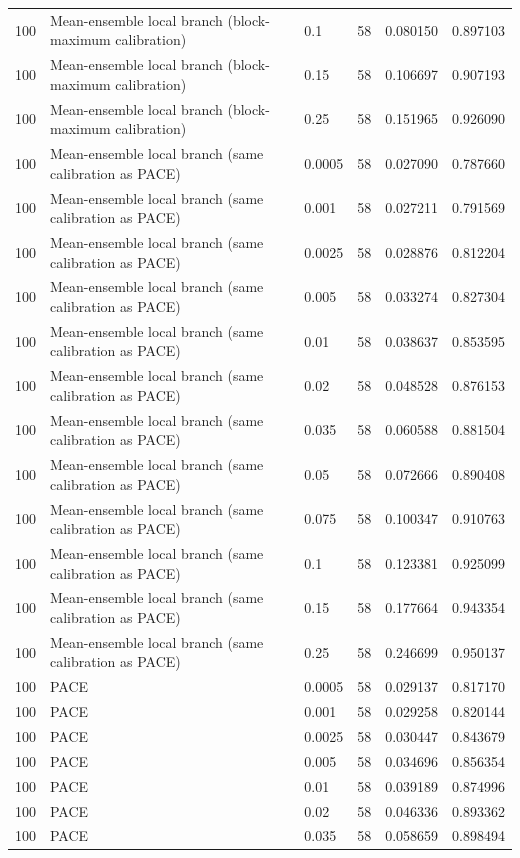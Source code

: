 \begin{tabular}{llllll}
100 & Mean-ensemble local branch (block-maximum calibration) & 0.1 & 58 & 0.080150 & 0.897103 \\
100 & Mean-ensemble local branch (block-maximum calibration) & 0.15 & 58 & 0.106697 & 0.907193 \\
100 & Mean-ensemble local branch (block-maximum calibration) & 0.25 & 58 & 0.151965 & 0.926090 \\
100 & Mean-ensemble local branch (same calibration as PACE) & 0.0005 & 58 & 0.027090 & 0.787660 \\
100 & Mean-ensemble local branch (same calibration as PACE) & 0.001 & 58 & 0.027211 & 0.791569 \\
100 & Mean-ensemble local branch (same calibration as PACE) & 0.0025 & 58 & 0.028876 & 0.812204 \\
100 & Mean-ensemble local branch (same calibration as PACE) & 0.005 & 58 & 0.033274 & 0.827304 \\
100 & Mean-ensemble local branch (same calibration as PACE) & 0.01 & 58 & 0.038637 & 0.853595 \\
100 & Mean-ensemble local branch (same calibration as PACE) & 0.02 & 58 & 0.048528 & 0.876153 \\
100 & Mean-ensemble local branch (same calibration as PACE) & 0.035 & 58 & 0.060588 & 0.881504 \\
100 & Mean-ensemble local branch (same calibration as PACE) & 0.05 & 58 & 0.072666 & 0.890408 \\
100 & Mean-ensemble local branch (same calibration as PACE) & 0.075 & 58 & 0.100347 & 0.910763 \\
100 & Mean-ensemble local branch (same calibration as PACE) & 0.1 & 58 & 0.123381 & 0.925099 \\
100 & Mean-ensemble local branch (same calibration as PACE) & 0.15 & 58 & 0.177664 & 0.943354 \\
100 & Mean-ensemble local branch (same calibration as PACE) & 0.25 & 58 & 0.246699 & 0.950137 \\
100 & PACE & 0.0005 & 58 & 0.029137 & 0.817170 \\
100 & PACE & 0.001 & 58 & 0.029258 & 0.820144 \\
100 & PACE & 0.0025 & 58 & 0.030447 & 0.843679 \\
100 & PACE & 0.005 & 58 & 0.034696 & 0.856354 \\
100 & PACE & 0.01 & 58 & 0.039189 & 0.874996 \\
100 & PACE & 0.02 & 58 & 0.046336 & 0.893362 \\
100 & PACE & 0.035 & 58 & 0.058659 & 0.898494 \\

\end{tabular}
